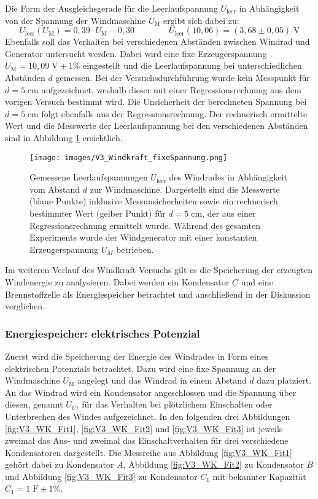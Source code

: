 \documentclass{article}
\begin{document}
\noindent Die Form der Ausgleichsgerade für die Leerlaufspannung $U_\text{leer}$ in Abhängigkeit von der Spannung der Windmaschine $U_\text{M}$ ergibt sich dabei zu:
$$U_\text{leer}(U_\text{M}) = 0{,}39 \cdot U_\text{M} - 0{,}30 \qquad \qquad U_\text{leer} (10{,}06) = (3{,}68 \pm 0{,}05) \; \text{V}$$
Ebenfalls soll das Verhalten bei verschiedenen Abständen zwischen Windrad und Generator untersucht werden. Dabei wird eine fixe Erzeugerspannung $U_\text{M} =10{,}09 \; \text{V} \pm 1 \%$ eingestellt und die Leerlaufspannung bei unterschiedlichen Abständen $d$ gemessen.
Bei der Versuchsdurchführung wurde kein Messpunkt für $d=5\; \text{cm}$ aufgezeichnet, weshalb dieser mit einer Regressionsrechnung aus dem vorigen Versuch bestimmt wird. Die Unsicherheit der berechneten Spannung bei $d=5 \; \text{cm}$ folgt ebenfalls aus der Regressionsrechnung.
Der rechnerisch ermittelte Wert und die Messwerte der Leerlaufspannung bei den verschiedenen Abständen sind in Abbildung \ref{fig:V3_WK_fixe_Spannung} ersichtlich.

\begin{figure}[H]
    \centering
    \texttt{[image: images/V3\_Windkraft\_fixeSpannung.png]}
    \caption{Gemessene Leerlaufspannungen $U_\text{leer}$ des Windrades in Abhängigkeit vom Abstand $d$ zur Windmaschine. Dargestellt sind die Messwerte (blaue Punkte) inklusive Messunsicherheiten sowie ein rechnerisch bestimmter Wert (gelber Punkt) für $d=5 \; \text{cm}$, der aus einer Regressionsrechnung ermittelt wurde.
    Während des gesamten Experiments wurde der Windgenerator mit einer konstanten Erzeugerspannung $U_M$ betrieben.}
    \label{fig:V3_WK_fixe_Spannung}
\end{figure}

\noindent Im weiteren Verlauf des Windkraft Versuchs gilt es die Speicherung der erzeugten Windenergie zu analysieren. Dabei werden ein Kondensator $C$ und eine Brennstoffzelle als Energiespeicher betrachtet und anschließend in der Diskussion verglichen.
\subsubsection{Energiespeicher: elektrisches Potenzial}
\noindent Zuerst wird die Speicherung der Energie des Windrades in Form eines elektrischen Potenzials betrachtet. Dazu wird eine fixe Spannung an der Windmaschine $U_\text{M}$ angelegt und das Windrad in einem Abstand $d$ dazu platziert. An das Windrad wird ein Kondensator angeschlossen und die Spannung über diesen, genannt $U_C$, für das Verhalten bei plötzlichem Einschalten oder Unterbrechen des Windes aufgezeichnet. In den folgenden drei Abbildungen \ref{fig:V3_WK_Fit1}, \ref{fig:V3_WK_Fit2} und \ref{fig:V3_WK_Fit3} ist jeweils zweimal das Aus- und zweimal das Einschaltverhalten für drei verschiedene Kondensatoren dargestellt. Die Messreihe aus Abbildung \ref{fig:V3_WK_Fit1} gehört dabei zu Kondensator $A$, Abbildung \ref{fig:V3_WK_Fit2} zu Kondensator $B$ und Abbildung \ref{fig:V3_WK_Fit3} zu Kondensator $C_1$ mit bekannter Kapazität $C_1 = 1 \; \text{F} \pm 1\%$.
\end{document}
